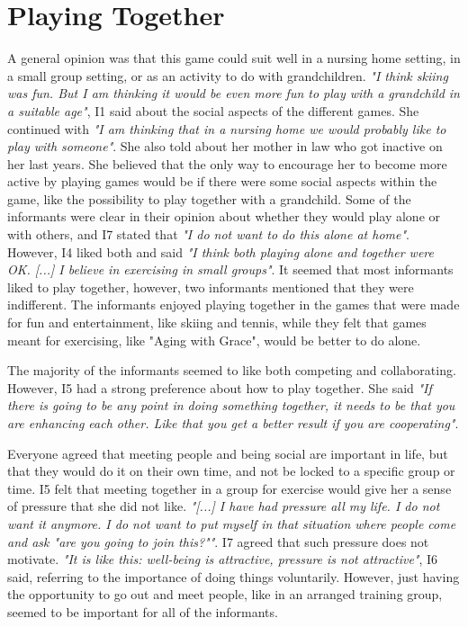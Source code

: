 \section{Playing Together}
A general opinion was that this game could suit well in a nursing home setting, in a small group setting, or as an activity to do with grandchildren. \emph{"I think skiing was fun. But I am thinking it would be even more fun to play with a grandchild in a suitable age"}, I1 said about the social aspects of the different games. She continued with \emph{"I am thinking that in a nursing home we would probably like to play with someone"}. She also told about her mother in law who got inactive on her last years. She believed that the only way to encourage her to become more active by playing games would be if there were some social aspects within the game, like the possibility to play together with a grandchild. Some of the informants were clear in their opinion about whether they would play alone or with others, and I7 stated that \emph{"I do not want to do this alone at home"}. However, I4 liked both and said \emph{"I think both playing alone and together were OK. [...] I believe in exercising in small groups"}. It seemed that most informants liked to play together, however, two informants mentioned that they were indifferent. The informants enjoyed playing together in the games that were made for fun and entertainment, like skiing and tennis, while they felt that games meant for exercising, like "Aging with Grace", would be better to do alone.  

The majority of the informants seemed to like both competing and collaborating. However, I5 had a strong preference about how to play together. She said
\emph{"If there is going to be any point in doing something together, it needs to be that you are enhancing each other. Like that you get a better result if you are cooperating"}.

Everyone agreed that meeting people and being social are important in life, but that they would do it on their own time, and not be locked to a specific group or time. I5 felt that meeting together in a group for exercise would give her a sense of pressure that she did not like. \emph{"[...] I have had pressure all my life. I do not want it anymore. I do not want to put myself in that situation where people come and ask "are you going to join this?""}. I7 agreed that such pressure does not motivate. \emph{"It is like this: well-being is attractive, pressure is not attractive"}, I6 said, referring to the importance of doing things voluntarily. However, just having the opportunity to go out and meet people, like in an arranged training group, seemed to be important for all of the informants. 

